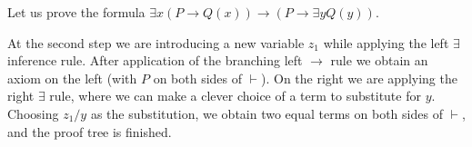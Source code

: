 

\setcounter{section}{2}
\setcounter{subsection}{2}
\setcounter{dfn}{7}

\begin{exl}
Let us prove the formula $\exists x(P \to Q(x)) \to (P \to \exists y Q(y))$.
\begin{prooftree}
\end{prooftree}

At the second step we are introducing a new variable $z_1$ while applying the left $\exists$ inference rule.
After application of the branching left $\to$ rule we obtain an axiom on the left (with $P$ on both sides of $\vdash$).
On the right we are applying the right $\exists$ rule, where we can make a clever choice of a term to substitute for $y$.
Choosing $z_1/y$ as the substitution, we obtain two equal terms on both sides of $\vdash$, and the proof tree is finished.
\end{exl}

